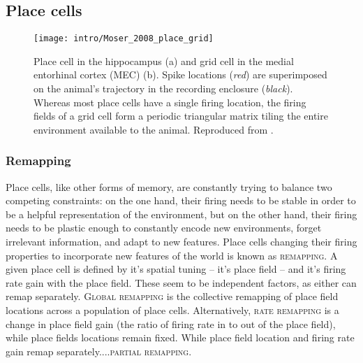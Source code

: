 \subsection{Place cells}\label{sec:intro:memory:place_cells}
\begin{figure}
	\centering
	\texttt{[image: intro/Moser\_2008\_place\_grid]}
	\caption[Place cell in the hippocampus and grid cell in the MEC]{Place cell in the hippocampus (a) and grid cell in the medial entorhinal cortex (MEC) (b).
	Spike locations (\emph{red}) are superimposed on the animal’s trajectory in the recording enclosure (\emph{black}).
	Whereas most place cells have a single firing location, the firing fields of a grid cell form a periodic triangular matrix tiling the entire environment available to the animal.
	Reproduced from \citet{Moser2008}.}
	\label{fig:intro:memory:place_grid}
\end{figure}

\subsubsection{Remapping}
\citep{Muller1987}
Place cells, like other forms of memory, are constantly trying to balance two competing constraints: on the one hand, their firing needs to be stable in order to be a helpful representation of the environment, but on the other hand, their firing needs to be plastic enough to constantly encode new environments, forget irrelevant information, and adapt to new features.
Place cells changing their firing properties to incorporate new features of the world is known as \textsc{remapping}.
A given place cell is defined by it's spatial tuning -- it's place field -- and it's firing rate gain with the place field.
These seem to be independent factors, as either can remap separately.
\textsc{Global remapping} is the collective remapping of place field locations across a population of place cells.
Alternatively, \textsc{rate remapping} is a change in place field gain (the ratio of firing rate in to out of the place field), while place fields locations remain fixed.
While place field location and firing rate gain remap separately....\textsc{partial remapping}.
